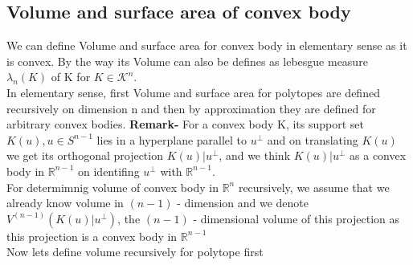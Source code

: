 \documentclass[oneside]{book}
\theoremstyle{definition}
\begin{document}
 \subsection{Volume and surface area of convex body}
We can define Volume and surface area for convex body in elementary sense as it is convex. By the way its Volume can also be defines as lebesgue measure $\lambda_{n}(K)$ of K  for $ K \in  \mathcal{K}^{n} $. \\
In elementary sense, first Volume and surface area for polytopes are defined recursively on dimension n and then by approximation they are defined for  arbitrary convex bodies. \newline
\textbf{Remark-} 
For a convex body  K, its support set $K(u),u \in S^{n-1} $ lies in a hyperplane parallel to 
$u^{\perp}$ and on translating $K(u)$ we get its orthogonal projection $K(u) | u^{\perp}$, and we think  $K(u) | u^{\perp}$ as a convex body in $\mathbb{R}^{n-1}$  on identifing $u^{\perp}$ with $\mathbb{R}^{n-1}$. \\
  For determimnig volume of convex body in $\mathbb{R}^{n}$ recursively, we assume that we already  know volume in $(n-1)$ - dimension and we denote $V^{(n-1)}\left(K(u) | u^{\perp}\right)$, the $(n-1)$ - dimensional volume of this projection as this projection is a convex body in $\mathbb{R}^{n-1}$ 
\\
Now lets define volume recursively for polytope first 
\end{document}
